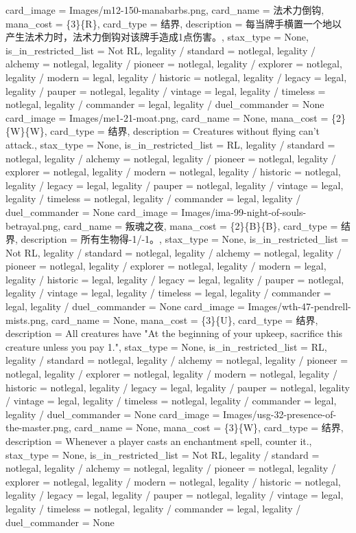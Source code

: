 \documentclass[lang = cn, color = black, 10pt]{AllThatStax}
\begin{document}
\card
{
	card_image = Images/m12-150-manabarbs.png,
	card_name = 法术力倒钩,
	mana_cost = \{3\}\{R\},
	card_type = 结界,
	description = 每当牌手横置一个地以产生法术力时，法术力倒钩对该牌手造成1点伤害。,
	stax_type = None,
	is_in_restricted_list = Not RL,
	legality / standard = notlegal,
	legality / alchemy = notlegal,
	legality / pioneer = notlegal,
	legality / explorer = notlegal,
	legality / modern = legal,
	legality / historic = notlegal,
	legality / legacy = legal,
	legality / pauper = notlegal,
	legality / vintage = legal,
	legality / timeless = notlegal,
	legality / commander = legal,
	legality / duel_commander = None
}
\card
{
	card_image = Images/me1-21-moat.png,
	card_name = None,
	mana_cost = \{2\}\{W\}\{W\},
	card_type = 结界,
	description = Creatures without flying can't attack.,
	stax_type = None,
	is_in_restricted_list = RL,
	legality / standard = notlegal,
	legality / alchemy = notlegal,
	legality / pioneer = notlegal,
	legality / explorer = notlegal,
	legality / modern = notlegal,
	legality / historic = notlegal,
	legality / legacy = legal,
	legality / pauper = notlegal,
	legality / vintage = legal,
	legality / timeless = notlegal,
	legality / commander = legal,
	legality / duel_commander = None
}
\card
{
	card_image = Images/ima-99-night-of-souls-betrayal.png,
	card_name = 叛魂之夜,
	mana_cost = \{2\}\{B\}\{B\},
	card_type = 结界,
	description = 所有生物得-1/-1。,
	stax_type = None,
	is_in_restricted_list = Not RL,
	legality / standard = notlegal,
	legality / alchemy = notlegal,
	legality / pioneer = notlegal,
	legality / explorer = notlegal,
	legality / modern = legal,
	legality / historic = legal,
	legality / legacy = legal,
	legality / pauper = notlegal,
	legality / vintage = legal,
	legality / timeless = legal,
	legality / commander = legal,
	legality / duel_commander = None
}
\card
{
	card_image = Images/wth-47-pendrell-mists.png,
	card_name = None,
	mana_cost = \{3\}\{U\},
	card_type = 结界,
	description = All creatures have "At the beginning of your upkeep, sacrifice this creature unless you pay {1}.",
	stax_type = None,
	is_in_restricted_list = RL,
	legality / standard = notlegal,
	legality / alchemy = notlegal,
	legality / pioneer = notlegal,
	legality / explorer = notlegal,
	legality / modern = notlegal,
	legality / historic = notlegal,
	legality / legacy = legal,
	legality / pauper = notlegal,
	legality / vintage = legal,
	legality / timeless = notlegal,
	legality / commander = legal,
	legality / duel_commander = None
}
\card
{
	card_image = Images/usg-32-presence-of-the-master.png,
	card_name = None,
	mana_cost = \{3\}\{W\},
	card_type = 结界,
	description = Whenever a player casts an enchantment spell, counter it.,
	stax_type = None,
	is_in_restricted_list = Not RL,
	legality / standard = notlegal,
	legality / alchemy = notlegal,
	legality / pioneer = notlegal,
	legality / explorer = notlegal,
	legality / modern = notlegal,
	legality / historic = notlegal,
	legality / legacy = legal,
	legality / pauper = notlegal,
	legality / vintage = legal,
	legality / timeless = notlegal,
	legality / commander = legal,
	legality / duel_commander = None
}
\end{document}

